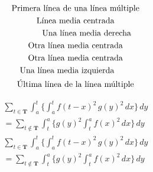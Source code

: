 \begin{frame}[fragile]
	\frametitle{\secname}

	\begin{multline}
		\text{Primera línea de una línea múltiple}
		\\
		\text{Línea media centrada}
		\\
		\shoveright{\text{Una línea media derecha}} \\
		\text{Otra línea media centrada}
		\\
		\text{Otra línea media centrada} \\
		\shoveleft{\text{Una línea media izquierda}}
		\\
		\text{Última línea de la línea múltiple}
	\end{multline}

	\begin{multline}
		\tag{2}
		\sum_{t\in\mathbf{T}}
		\int_{a}^{t}
		\biggl\lbrace
		\int_{a}^{t}
		f\left(t-x\right)^{2}\,
		g\left(y\right)^{2}\,dx
		\biggr\rbrace
		\,dy \\
		= \sum_{t\notin\mathbf{T}}
		\int_{t}^{a}
		\biggl\lbrace
		g\left(y\right)^{2}
		\int_{t}^{a}
		f\left(x\right)^{2}\,dx
		\biggr\rbrace\,dy
	\end{multline}
	\setlength\multlinegap{0pt}
	\begin{multline}
		\tag{2}
		\sum_{t\in\mathbf{T}}
		\int_{a}^{t}
		\biggl\lbrace
		\int_{a}^{t}
		f\left(t-x\right)^{2}\,
		g\left(y\right)^{2}\,dx
		\biggr\rbrace\,dy \\
		=\sum_{t\notin\mathbf{T}}
		\int_{t}^{a}
		\biggl\lbrace
		g\left(y\right)^{2}
		\int_{t}^{a}
		f\left(x\right)^{2}\,dx
		\biggr\rbrace
		\,dy
	\end{multline}
\end{frame}

